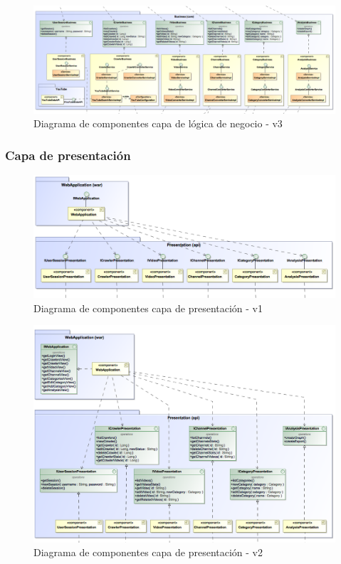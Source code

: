 \documentclass[11pt,a4paper]{article}
\begin{document}
\begin{figure}[H]
\centering
\includegraphics[scale=0.25]{diseno/negocio/ComponentDiagram3.png}
\caption{Diagrama de componentes capa de lógica de negocio - v3}
\end{figure}

\medskip 

\subsubsection{Capa de presentación}

\begin{figure}[H]
\centering
\includegraphics[scale=0.35]{diseno/presentacion/ComponentsDiagram.png}
\caption{Diagrama de componentes capa de presentación - v1}
\end{figure}

\begin{figure}[H]
\centering
\includegraphics[scale=0.3]{diseno/presentacion/ComponentDiagram2.png}
\caption{Diagrama de componentes capa de presentación - v2}
\end{figure}
\end{document}
